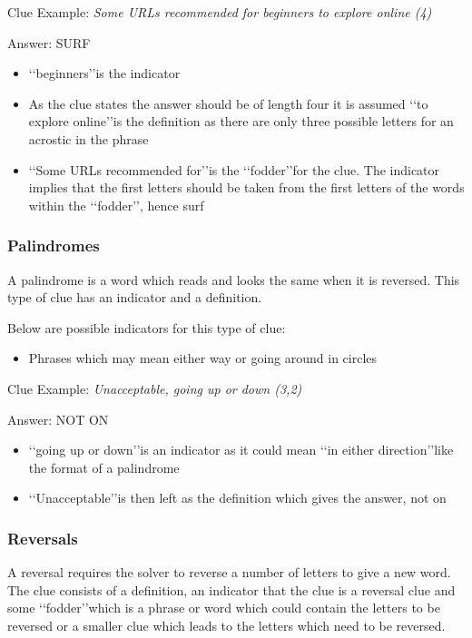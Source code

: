 Clue Example: \emph{Some URLs recommended for beginners to explore online (4)}

Answer: SURF 

\begin{itemize}
	\item \lq\lq beginners\rq\rq is the indicator 
	\item As the clue states the answer should be of length four it is assumed \lq\lq to explore online\rq\rq is the definition as there are only three possible letters for an acrostic in the phrase 
	\item \lq\lq Some URLs recommended for\rq\rq is the \lq\lq fodder\rq\rq for the clue. The indicator implies that the first letters should be taken from the first letters of the words within the \lq\lq fodder\rq\rq, hence surf  
\end{itemize}
 
\subsubsection{Palindromes}

A palindrome is a word which reads and looks the same when it is reversed. This type of clue has an indicator and a definition. 

Below are possible indicators for this type of clue:
\begin{itemize} 
	\item Phrases which may mean either way or going around in circles
\\
\end{itemize}

Clue Example: \emph{Unacceptable, going up or down (3,2)}  

Answer: NOT ON 

\begin{itemize}
	\item \lq\lq going up or down\rq\rq is an indicator as it could mean \lq\lq in either direction\rq\rq like the format of a palindrome 
	\item \lq\lq Unacceptable\rq\rq is then left as the definition which gives the answer, not on 
\end{itemize}

\subsubsection{Reversals}

A reversal requires the solver to reverse a number of letters to give a new word. The clue consists of a definition, an indicator that the clue is a reversal clue and some \lq\lq fodder\rq\rq which is a phrase or word which could contain the letters to be reversed or a smaller clue which leads to the letters which need to be reversed.  

